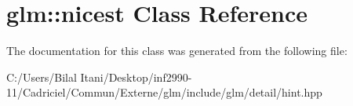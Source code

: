 \hypertarget{classglm_1_1nicest}{}\section{glm\+:\+:nicest Class Reference}
\label{classglm_1_1nicest}


The documentation for this class was generated from the following file\+:\begin{DoxyCompactItemize}
\item 
C\+:/\+Users/\+Bilal Itani/\+Desktop/inf2990-\/11/\+Cadriciel/\+Commun/\+Externe/glm/include/glm/detail/hint.\+hpp\end{DoxyCompactItemize}
